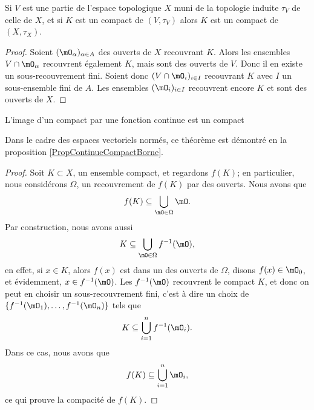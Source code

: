 \begin{proposition}     \label{PropGBZUooRKaOxy}
    Si \( V\) est une partie de l'espace topologique \( X\) muni de la topologie induite \( \tau_V\) de celle de \( X\), et si \( K\) est un compact de \( (V,\tau_V)\) alors \( K\) est un compact de \( (X,\tau_X)\).
\end{proposition}

\begin{proof}
    Soient \(   (\mO_\alpha)_{\alpha\in A}  \) des ouverts de \( X\) recouvrant \( K\). Alors les ensembles \( V\cap \mO_{\alpha}\) recouvrent également \( K\), mais sont des ouverts de \( V\). Donc il en existe un sous-recouvrement fini. Soient donc \( (V\cap\mO_i)_{i\in I}\) recouvrant \( K\) avec \( I\) un sous-ensemble fini de \( A\). Les ensembles \( (\mO_i)_{i\in I}\) recouvrent encore \( K\) et sont des ouverts de \( X\).
\end{proof}

\begin{theorem}     \label{ThoImCompCotComp}
L'image d'un compact par une fonction continue est un compact
\end{theorem}
Dans le cadre des espaces vectoriels normés, ce théorème est démontré en la proposition \ref{PropContinueCompactBorne}.

\begin{proof}
    Soit $K\subset X$, un ensemble compact, et regardons $f(K)$; en particulier, nous considérons $\Omega$, un recouvrement de $f(K)$ par des ouverts. Nous avons que
    \begin{equation}
        f(K)\subseteq\bigcup_{\mO\in\Omega}\mO.
    \end{equation}
    Par construction, nous avons aussi
    \begin{equation}
        K\subseteq\bigcup_{\mO\in\Omega}f^{-1}(\mO),
    \end{equation}
    en effet, si $x\in K$, alors $f(x)$ est dans un des ouverts de $\Omega$, disons $f(x)\in \mO_0$, et évidemment, $x\in f^{-1}(\mO)$.  Les $f^{-1}(\mO)$ recouvrent le compact $K$, et donc on peut en choisir un sous-recouvrement fini, c'est à dire un choix de $\{ f^{-1}(\mO_1),\ldots,f^{-1}(\mO_n) \}$ tels que
    \begin{equation}
        K\subseteq \bigcup_{i=1}^nf^{-1}(\mO_i).
    \end{equation}
    Dans ce cas, nous avons que
    \begin{equation}
        f(K)\subseteq\bigcup_{i=1}^n\mO_i,
    \end{equation}
    ce qui prouve la compacité de $f(K)$.
\end{proof}

